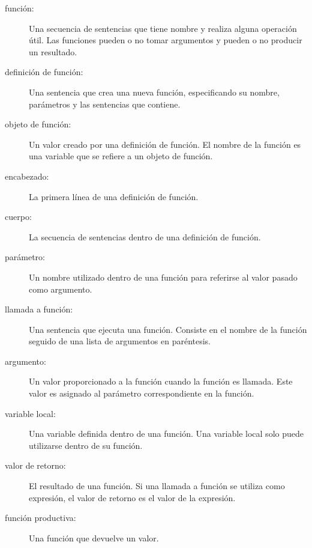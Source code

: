 \documentclass[10pt]{book}
\begin{document}
\begin{description}

\item[función:] Una secuencia de sentencias que tiene nombre y realiza alguna
operación útil.  Las funciones pueden o no tomar argumentos y pueden o no
producir un resultado.

\item[definición de función:]  Una sentencia que crea una nueva función,
especificando su nombre, parámetros y las sentencias que contiene.

\item[objeto de función:]  Un valor creado por una definición de función.
El nombre de la función es una variable que se refiere a un objeto
de función.

\item[encabezado:] La primera línea de una definición de función.

\item[cuerpo:] La secuencia de sentencias dentro de una definición de función.

\item[parámetro:] Un nombre utilizado dentro de una función para referirse al valor
pasado como argumento.

\item[llamada a función:] Una sentencia que ejecuta una función.
Consiste en el nombre de la función seguido de una lista de argumentos en
paréntesis.

\item[argumento:]  Un valor proporcionado a la función cuando la función es llamada.
Este valor es asignado al parámetro correspondiente en la función.

\item[variable local:]  Una variable definida dentro de una función. Una variable
local solo puede utilizarse dentro de su función.

\item[valor de retorno:]  El resultado de una función.  Si una llamada a función
se utiliza como expresión, el valor de retorno es el valor de
la expresión.

\item[función productiva:] Una función que devuelve un valor.


\end{description}
\end{document}

